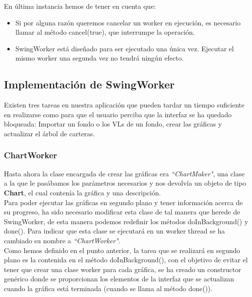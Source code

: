 \documentclass[12pt, a4paper]{book}
\begin{document}
En última instancia hemos de tener en cuenta que:

\begin{itemize}
	\item Si por alguna razón queremos cancelar un worker en ejecución, es necesario llamar al método cancel(true), que interrumpe la operación.
	\item SwingWorker está diseñado para ser ejecutado una única vez. Ejecutar el mismo worker una segunda vez no tendrá ningún efecto.
\end{itemize}


\newpage

\subsection{Implementación de SwingWorker}

Existen tres tareas en nuestra aplicación que pueden tardar un tiempo suficiente en realizarse como para que el usuario perciba que la interfaz se ha quedado bloqueada: Importar un fondo o los \gls{VL}s de un fondo, crear las gráficas y actualizar el árbol de carteras.

\subsubsection{ChartWorker}

Hasta ahora la clase encargada de crear las gráficas era \textit{``ChartMaker"}, una clase a la que le pasábamos los parámetros necesarios y nos devolvía un objeto de tipo \textbf{Chart}, el cual contenía la gráfica y una descripción.\\

Para poder ejecutar las gráficas en segundo plano y tener información acerca de su progreso, ha sido necesario modificar esta clase de tal manera que herede de SwingWorker, de esta manera podemos redefinir los métodos doInBackground() y done(). Para indicar que esta clase se ejecutará en un worker thread se ha cambiado su nombre a \textit{``ChartWorker"}. \\

Como hemos definido en el punto anterior, la tarea que se realizará en segundo plano es la contenida en el método doInBackground(), con el objetivo de evitar el tener que crear una clase worker para cada gráfica, se ha creado un constructor genérico donde se proporcionan los elementos de la interfaz que se actualizan cuando la gráfica está terminada (cuando se llama al método done()).\\
\end{document}
